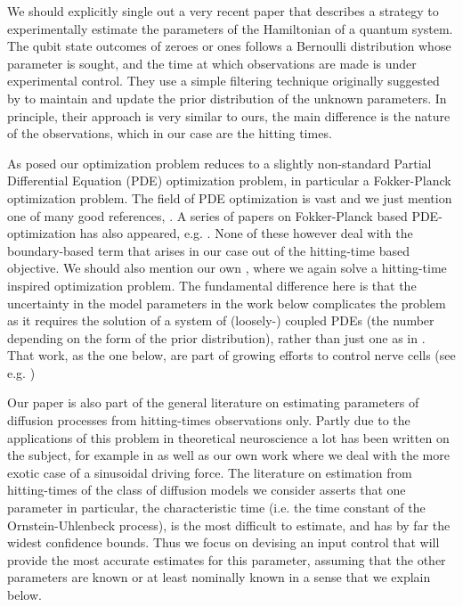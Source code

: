 \documentclass{article}
\begin{document}
We should explicitly single out a very recent paper \cite{Granade2012} that
describes a strategy to experimentally estimate the parameters of the
Hamiltonian of a quantum system. The qubit state outcomes of zeroes or ones
follows a Bernoulli distribution whose parameter is sought, and the time at
which observations are made is under experimental control. They use a simple
filtering technique originally suggested by \cite{Liu2001} to maintain and
update the prior distribution of the unknown parameters. In principle, their
approach is very similar to ours, the main difference is the nature of the
observations, which in our case are the hitting times.

As posed our optimization problem reduces to a slightly non-standard Partial
Differential Equation (PDE) optimization problem, in particular a
Fokker-Planck optimization problem. The field of PDE optimization is vast 
and we just mention one of many good
references, \cite{Borzi2012}. A series of papers on
Fokker-Planck based PDE-optimization has also appeared, e.g. \cite{Annunziato2010,Annunziato2014}.
None of these however deal with the boundary-based term that arises in our case out of the
hitting-time based objective. We should also mention our own \cite{Iolov2014a},
where we again solve a hitting-time inspired optimization problem. The
fundamental difference here is that the uncertainty in the model parameters
in the work below complicates the problem as it requires the solution of a system of
(loosely-) coupled PDEs (the number depending on the form of the prior
distribution), rather than just one as in \cite{Iolov2014a}. That work, as the
one below, are part of growing efforts to control nerve cells (see
e.g. \cite{Ullah2009})

Our paper is also part of the general literature on estimating parameters of
diffusion processes from hitting-times observations only. Partly due to the
applications of this problem in theoretical neuroscience a lot has been written
on the subject, for example in
\cite{Ditlevsen2007,MullowneyIyengar2008,Alili2005} as well as our own work
\cite{Iolov2013} where we deal with the more exotic case of a sinusoidal driving
force. The literature on estimation from hitting-times of the class of diffusion
models we consider asserts that one parameter in particular, the characteristic
time (i.e. the time constant of the Ornstein-Uhlenbeck process), is the most
difficult to estimate, and has by far the widest confidence bounds. Thus we
focus on devising an input control that will provide the most accurate estimates
for this parameter, assuming that the other parameters are known or at least
nominally known in a sense that we explain below.
\end{document}
